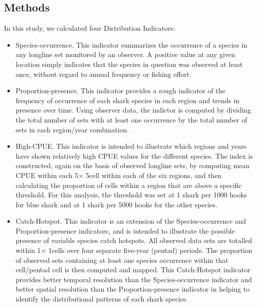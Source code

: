 \documentclass[12pt]{SCreport}
\begin{document}
      
      \subsection{Methods}
      In this study, we calculated four Distribution Indicators:
      
\begin{itemize}
\item	Species-occurrence.  This indicator summarizes the occurrence of a species in any longline set monitored by an observer.  A positive value at any given location simply indicates that the species in question was observed at least once, without regard to annual frequency or fishing effort.

\item	Proportion-presence.  This indicator provides a rough indicator of the frequency of occurrence of each shark species in each region and trends in presence over time.  Using observer data, the indictor is computed by dividing the total number of sets with at least one occurrence by the total number of sets in each region/year combination.
\item	High-CPUE.  This indicator is intended to illustrate which regions and years have shown relatively high CPUE values for the different species.  The index is constructed, again on the basis of observed longline sets, by computing mean CPUE within each 5\degree $\times$ 5\degree cell within each of the six regions, and then calculating the proportion of cells within a region that are above a specific threshold.  For this analysis, the threshold was set at 1 shark per 1000 hooks for blue shark and at 1 shark per 5000 hooks for the other species.
\item	Catch-Hotspot.  This indicator is an extension of the Species-occurrence and Proportion-presence indicators, and is intended to illustrate the possible presence of variable species catch hotspots.  All observed data sets are totalled within 1\degree $\times$ 1\degree cells over four separate five-year (pentad) periods.  The proportion of observed sets containing at least one species occurrence within that cell/pentad cell is then computed and mapped.  This Catch-Hotspot indicator provides better temporal resolution than the Species-occurrence indicator and better spatial resolution than the Proportion-presence indicator in helping to identify the distributional patterns of each shark species.
\end{itemize}
\end{document}
